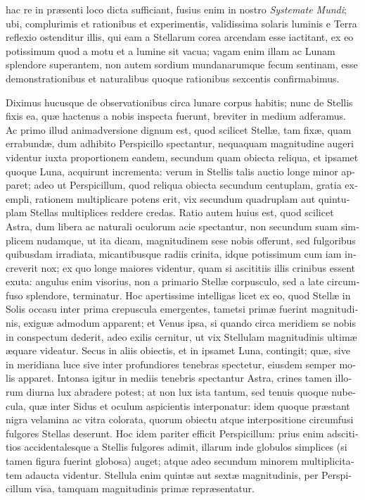 \documentclass[11pt,twoside,openany]{book}
\begin{document}
\begin{otherlanguage}{latin}
hac re in præsenti loco dicta sufficiant, fusius enim in nostro \textit{Systemate Mundi}; ubi, complurimis et rationibus et experimentis, validissima solaris luminis e Terra reflexio ostenditur illis, qui eam a Stellarum corea arcendam esse iactitant, ex eo potissimum quod a motu et a lumine sit vacua; vagam enim illam ac Lunam splendore superantem, non autem sordium mundanarumque fecum sentinam, esse demonstrationibus et naturalibus quoque rationibus sexcentis confirmabimus.

Diximus hucusque de observationibus circa lunare corpus habitis; nunc de Stellis fixis ea, quæ hactenus a nobis inspecta fuerunt, breviter in medium adferamus. Ac primo illud animadversione dignum est, quod scilicet Stellæ, tam fixæ, quam errabundæ, dum adhibito Perspicillo spectantur, nequaquam magnitudine augeri videntur iuxta proportionem eandem, secundum quam obiecta reliqua, et ipsamet quoque Luna, acquirunt incrementa: verum in Stellis talis auctio longe minor apparet; adeo ut Perspicillum, quod reliqua obiecta secundum centuplam, gratia exempli, rationem multiplicare potens erit, vix secundum quadruplam aut quintuplam Stellas multiplices reddere credas. Ratio autem huius est, quod scilicet Astra, dum libera ac naturali oculorum acie spectantur, non secundum suam simplicem nudamque, ut ita dicam, magnitudinem sese nobis offerunt, sed fulgoribus quibusdam irradiata, micantibusque radiis crinita, idque potissimum cum iam increverit nox; ex quo longe maiores videntur, quam si ascititiis illis crinibus essent exuta: angulus enim visorius, non a primario Stellæ corpusculo, sed a late circumfuso splendore, terminatur. Hoc apertissime intelligas licet ex eo, quod Stellæ in Solis occasu inter prima crepuscula emergentes, tametsi primæ fuerint magnitudinis, exiguæ admodum apparent; et Venus ipsa, si quando circa meridiem se nobis in conspectum dederit, adeo exilis cernitur, ut vix Stellulam magnitudinis ultimæ æquare videatur. Secus in aliis obiectis, et in ipsamet Luna, contingit; quæ, sive in meridiana luce sive inter profundiores tenebras spectetur, eiusdem semper molis apparet. Intonsa igitur in mediis tenebris spectantur Astra, crines tamen illorum diurna lux abradere potest; at non lux ista tantum, sed tenuis quoque nubecula, quæ inter Sidus et oculum aspicientis interponatur: idem quoque præstant nigra velamina ac vitra colorata, quorum obiectu atque interpositione circumfusi fulgores Stellas deserunt. Hoc idem pariter efficit Perspicillum: prius enim adscititios accidentalesque a Stellis fulgores adimit, illarum inde globulos simplices (si tamen figura fuerint globosa) auget; atque adeo secundum minorem multiplicitatem adaucta videntur. Stellula enim quintæ aut sextæ magnitudinis, per Perspicillum visa, tamquam magnitudinis primæ repræsentatur.


\end{otherlanguage}
\end{document}
